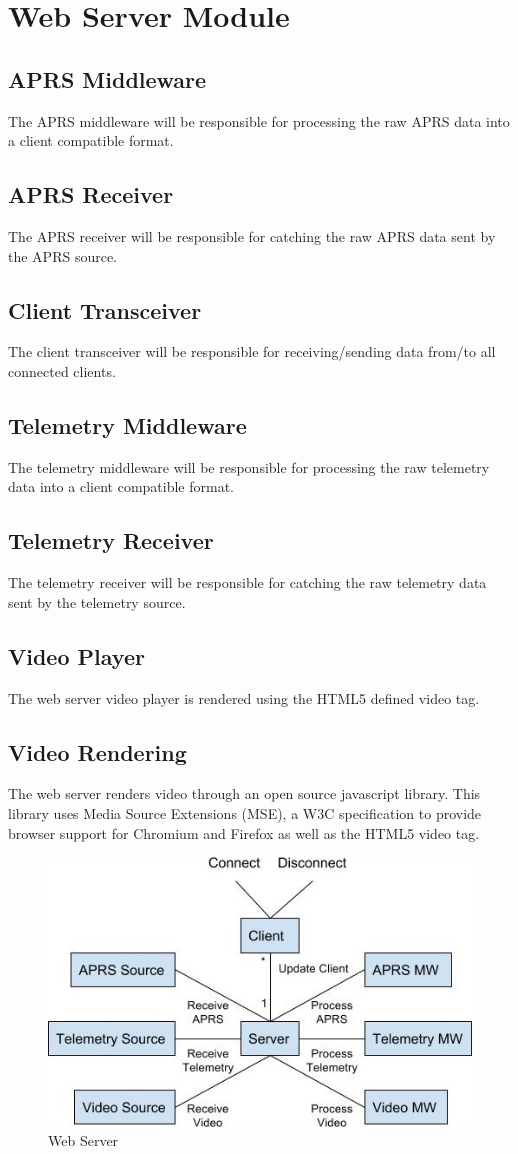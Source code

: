 \section{Web Server Module}

\subsection{APRS Middleware}
The APRS middleware will be responsible for processing the raw APRS data into a client compatible format.

\subsection{APRS Receiver}
The APRS receiver will be responsible for catching the raw APRS data sent by the APRS source.

\subsection{Client Transceiver}
The client transceiver will be responsible for receiving/sending data from/to all connected clients.

\subsection{Telemetry Middleware}
The telemetry middleware will be responsible for processing the raw telemetry data into a client compatible format.

\subsection{Telemetry Receiver}
The telemetry receiver will be responsible for catching the raw telemetry data sent by the telemetry source.

\subsection{Video Player}
The web server video player is rendered using the HTML5 defined video tag.

\subsection{Video Rendering}
The web server renders video through an open source javascript library. This library uses Media Source
Extensions (MSE), a W3C specification to provide browser support for Chromium and Firefox as well as the HTML5
video tag.

\begin{figure}[!ht]
  \centering
  \includegraphics[scale=.8]{imgs/web_server.jpg}
  \caption{Web Server}
\end{figure}
